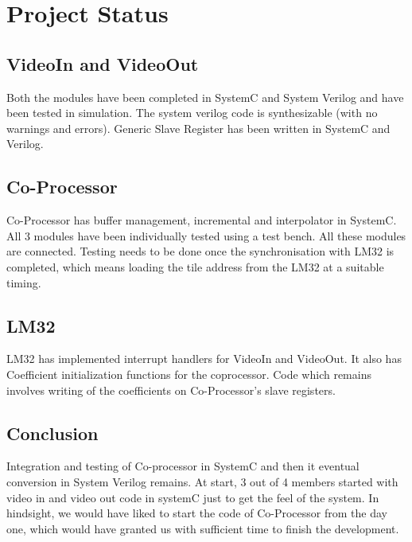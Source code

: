 

\section{Project Status}

\subsection{VideoIn and VideoOut}
Both the modules have been completed in SystemC and System Verilog and have been tested in simulation. The system verilog code is synthesizable (with no warnings and errors). Generic Slave Register has been written in SystemC and Verilog. 

\subsection{Co-Processor}
Co-Processor has buffer management, incremental and interpolator in SystemC. All 3 modules have been individually tested using a test bench. All these modules are connected. Testing needs to be done once the synchronisation with LM32 is completed, which means loading the tile address from the LM32 at a suitable timing. 

\subsection{LM32}
LM32 has implemented interrupt handlers for VideoIn and VideoOut. It also has Coefficient initialization functions for the coprocessor. Code which remains involves writing of the coefficients on Co-Processor's slave registers.

\subsection{Conclusion}
Integration and testing of Co-processor in SystemC and then it eventual conversion in System Verilog remains. At start, 3 out of 4 members started with video in and video out code in systemC just to get the feel of the system. In hindsight, we would have liked to start the code of Co-Processor from the day one, which would have granted us with sufficient time to finish the development.


